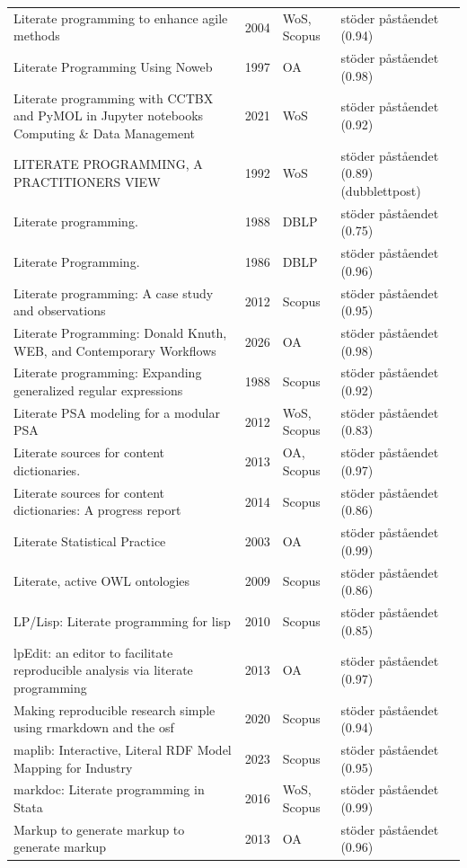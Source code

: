 \begin{longtable}{@{}%
  >{\raggedright\arraybackslash}p{}c%
  >{\raggedright\arraybackslash}p{}%
  >{\raggedright\arraybackslash}p{}@{}}
Literate programming to enhance agile methods & 2004 & WoS, Scopus & stöder påståendet (0.94) \\
Literate Programming Using Noweb & 1997 & OA & stöder påståendet (0.98) \\
Literate programming with CCTBX and PyMOL in Jupyter notebooks Computing \& Data Management & 2021 & WoS & stöder påståendet (0.92) \\
LITERATE PROGRAMMING, A PRACTITIONERS VIEW & 1992 & WoS & stöder påståendet (0.89) (dubblettpost) \\
Literate programming. & 1988 & DBLP & stöder påståendet (0.75) \\
Literate Programming. & 1986 & DBLP & stöder påståendet (0.96) \\
Literate programming: A case study and observations & 2012 & Scopus & stöder påståendet (0.95) \\
Literate Programming: Donald Knuth, WEB, and Contemporary Workflows & 2026 & OA & stöder påståendet (0.98) \\
Literate programming: Expanding generalized regular expressions & 1988 & Scopus & stöder påståendet (0.92) \\
Literate PSA modeling for a modular PSA & 2012 & WoS, Scopus & stöder påståendet (0.83) \\
Literate sources for content dictionaries. & 2013 & OA, Scopus & stöder påståendet (0.97) \\
Literate sources for content dictionaries: A progress report & 2014 & Scopus & stöder påståendet (0.86) \\
Literate Statistical Practice & 2003 & OA & stöder påståendet (0.99) \\
Literate, active OWL ontologies & 2009 & Scopus & stöder påståendet (0.86) \\
LP/Lisp: Literate programming for lisp & 2010 & Scopus & stöder påståendet (0.85) \\
lpEdit: an editor to facilitate reproducible analysis via literate programming & 2013 & OA & stöder påståendet (0.97) \\
Making reproducible research simple using rmarkdown and the osf & 2020 & Scopus & stöder påståendet (0.94) \\
maplib: Interactive, Literal RDF Model Mapping for Industry & 2023 & Scopus & stöder påståendet (0.95) \\
markdoc: Literate programming in Stata & 2016 & WoS, Scopus & stöder påståendet (0.99) \\
Markup to generate markup to generate markup & 2013 & OA & stöder påståendet (0.96) \\

\end{longtable}
